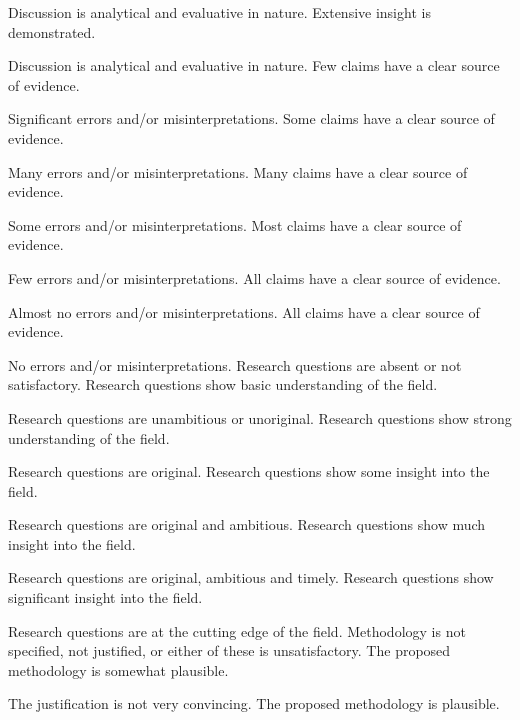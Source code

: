 \documentclass{../fal_assignment}
\begin{document}
\begin{markingrubric}
        \par		Discussion is analytical and evaluative in nature.
        \grade		Extensive insight is demonstrated.
        \par		Discussion is analytical and evaluative in nature.
        \grade\fail Few claims have a clear source of evidence.
        \par 		Significant errors and/or misinterpretations.
        \grade 		Some claims have a clear source of evidence.
        \par 		Many errors and/or misinterpretations.
        \grade 		Many claims have a clear source of evidence.
        \par 		Some errors and/or misinterpretations.
        \grade 		Most claims have a clear source of evidence.
        \par 		Few errors and/or misinterpretations.
        \grade 		All claims have a clear source of evidence.
        \par 		Almost no errors and/or misinterpretations.
        \grade 		All claims have a clear source of evidence.
        \par 		No errors and/or misinterpretations.
        \grade\fail Research questions are absent or not satisfactory.
        \grade 		Research questions show basic understanding of the field.
        \par		Research questions are unambitious or unoriginal.
        \grade 		Research questions show strong understanding of the field.
        \par		Research questions are original.
        \grade 		Research questions show some insight into the field.
        \par		Research questions are original and ambitious.
        \grade 		Research questions show much insight into the field.
        \par		Research questions are original, ambitious and timely.
        \grade 		Research questions show significant insight into the field.
        \par		Research questions are at the cutting edge of the field.
        \grade\fail Methodology is not specified, not justified, or either of these is unsatisfactory.
        \grade 		The proposed methodology is somewhat plausible.
        \par		The justification is not very convincing.
        \grade 		The proposed methodology is plausible.

\end{markingrubric}
\end{document}
